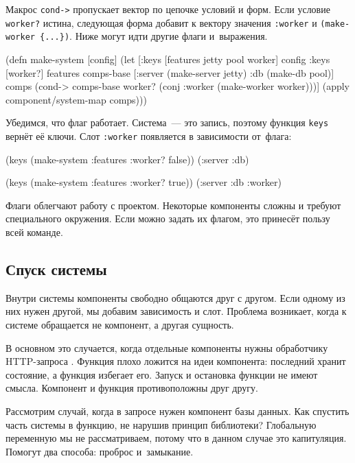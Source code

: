 Макрос \verb|cond->| пропускает вектор по цепочке условий и форм. Если условие
\verb|worker?| истина, следующая форма добавит к вектору значения \verb|:worker|
и \verb|(make-worker {...})|. Ниже могут идти другие флаги и~выражения.

\begin{english}
  \begin{clojure}
(defn make-system [config]
  (let [{:keys [features jetty pool worker]} config
        {:keys [worker?]} features
        comps-base [:server (make-server jetty)
                    :db (make-db pool)]
        comps (cond-> comps-base
                worker?
                (conj :worker (make-worker worker)))]
    (apply component/system-map comps)))
  \end{clojure}
\end{english}

Убедимся, что флаг работает. Система~--- это запись, поэтому функция \verb|keys|
вернёт её ключи. Слот \verb|:worker| появляется в зависимости от~флага:

\begin{english}
  \begin{clojure}
(keys (make-system {:features {:worker? false}}))
(:server :db)

(keys (make-system {:features {:worker? true}}))
(:server :db :worker)
  \end{clojure}
\end{english}

Флаги облегчают работу с проектом. Некоторые компоненты сложны и требуют
специального окружения. Если можно задать их флагом, это принесёт пользу
всей команде.

\subsection{Спуск системы}


Внутри системы компоненты свободно общаются друг с другом. Если одному из них
нужен другой, мы добавим зависимость и слот. Проблема возникает, когда к системе
обращается не компонент, а другая сущность.

В основном это случается, когда отдельные компоненты нужны обработчику
HTTP-запроса . Функция плохо ложится на идеи компонента:
последний хранит состояние, а функция избегает его. Запуск и остановка функции
не имеют смысла. Компонент и функция противоположны друг другу.

Рассмотрим случай, когда в запросе нужен компонент базы данных. Как спустить
часть системы в функцию, не нарушив принцип библиотеки? Глобальную переменную мы
не рассматриваем, потому что в данном случае это капитуляция. Помогут два
способа: проброс и~замыкание.

